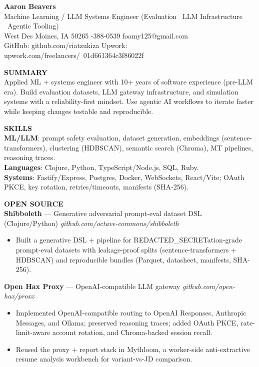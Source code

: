\documentclass[10pt]{article}
\begin{document}
{\LARGE \textbf{Aaron Beavers}}\\
Machine Learning / LLM Systems Engineer (Evaluation \textbullet\ LLM Infrastructure \textbullet\ Agentic Tooling)\\

West Des Moines, IA 50265 \;\;\textbar\;-388-0539 \;\;\textbar\;\; foamy125@gmail.com\\
GitHub: github.com/riatzukiza \;\;\textbar\;\; Upwork: upwork.com/freelancers/~01d661364c3f86022f

\vspace{4pt}
\textbf{SUMMARY}\\
Applied ML + systems engineer with 10+ years of software experience (pre-LLM era). Build evaluation datasets, LLM gateway infrastructure, and simulation systems with a reliability-first mindset. Use agentic AI workflows to iterate faster while keeping changes testable and reproducible.

\vspace{2pt}
\textbf{SKILLS}\\
\textbf{ML/LLM}: prompt safety evaluation, dataset generation, embeddings (sentence-transformers), clustering (HDBSCAN), semantic search (Chroma), MT pipelines, reasoning traces.\\
\textbf{Languages}: Clojure, Python, TypeScript/Node.js, SQL, Ruby.\\
\textbf{Systems}: Fastify/Express, Postgres, Docker, WebSockets, React/Vite; OAuth PKCE, key rotation, retries/timeouts, manifests (SHA-256).

\vspace{4pt}
\textbf{OPEN SOURCE}\\

\textbf{Shibboleth} --- Generative adversarial prompt-eval dataset DSL (Clojure/Python) \hfill \textit{github.com/octave-commons/shibboleth}\\
\vspace{-6pt}
\begin{itemize}
  \setlength\itemsep{-2pt}
  \setlength\parskip{0pt}
  \setlength\parsep{0pt}
  \item Built a generative DSL + pipeline for REDACTED_SECRETation-grade prompt-eval datasets with leakage-proof splits (sentence-transformers + HDBSCAN) and reproducible bundles (Parquet, datasheet, manifests, SHA-256).
\end{itemize}

\textbf{Open Hax Proxy} --- OpenAI-compatible LLM gateway \hfill \textit{github.com/open-hax/proxx}\\
\vspace{-6pt}
\begin{itemize}
  \setlength\itemsep{-2pt}
  \setlength\parskip{0pt}
  \setlength\parsep{0pt}
  \item Implemented OpenAI-compatible routing to OpenAI Responses, Anthropic Messages, and Ollama; preserved reasoning traces; added OAuth PKCE, rate-limit-aware account rotation, and Chroma-backed session recall.
  \item Reused the proxy + report stack in Mythloom, a worker-side anti-extractive resume analysis workbench for variant-vs-JD comparison.
\end{itemize}
\end{document}
